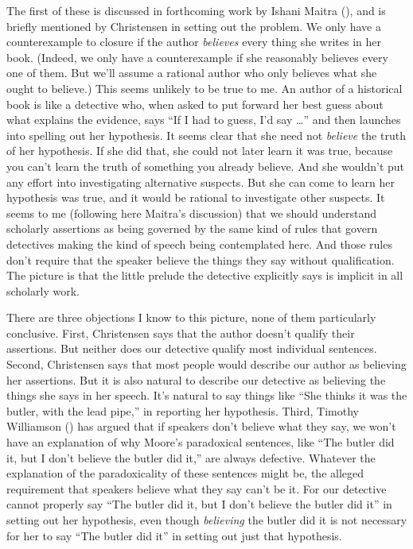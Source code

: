 \documentclass[
  11pt,
  letterpaper,
  DIV=11,
  numbers=noendperiod,
  twoside]{scrartcl}
\begin{document}
The first of these is discussed in forthcoming work by Ishani Maitra
(), and is briefly mentioned by
Christensen in setting out the problem. We only have a counterexample to
closure if the author \emph{believes} every thing she writes in her
book. (Indeed, we only have a counterexample if she reasonably believes
every one of them. But we'll assume a rational author who only believes
what she ought to believe.) This seems unlikely to be true to me. An
author of a historical book is like a detective who, when asked to put
forward her best guess about what explains the evidence, says ``If I had
to guess, I'd say \ldots{}'' and then launches into spelling out her
hypothesis. It seems clear that she need not \emph{believe} the truth of
her hypothesis. If she did that, she could not later learn it was true,
because you can't learn the truth of something you already believe. And
she wouldn't put any effort into investigating alternative suspects. But
she can come to learn her hypothesis was true, and it would be rational
to investigate other suspects. It seems to me (following here Maitra's
discussion) that we should understand scholarly assertions as being
governed by the same kind of rules that govern detectives making the
kind of speech being contemplated here. And those rules don't require
that the speaker believe the things they say without qualification. The
picture is that the little prelude the detective explicitly says is
implicit in all scholarly work.

There are three objections I know to this picture, none of them
particularly conclusive. First, Christensen says that the author doesn't
qualify their assertions. But neither does our detective qualify most
individual sentences. Second, Christensen says that most people would
describe our author as believing her assertions. But it is also natural
to describe our detective as believing the things she says in her
speech. It's natural to say things like ``She thinks it was the butler,
with the lead pipe,'' in reporting her hypothesis. Third, Timothy
Williamson () has argued that
if speakers don't believe what they say, we won't have an explanation of
why Moore's paradoxical sentences, like ``The butler did it, but I don't
believe the butler did it,'' are always defective. Whatever the
explanation of the paradoxicality of these sentences might be, the
alleged requirement that speakers believe what they say can't be it. For
our detective cannot properly say ``The butler did it, but I don't
believe the butler did it'' in setting out her hypothesis, even though
\emph{believing} the butler did it is not necessary for her to say ``The
butler did it'' in setting out just that hypothesis.
\end{document}
